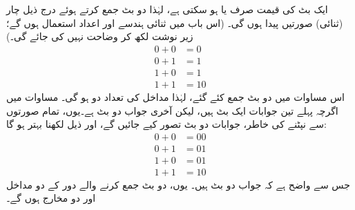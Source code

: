  ایک بٹ کی قیمت صرف   یا   ہو سکتی ہے،  لہٰذا دو بٹ جمع کرتے ہوئے  درج   ذیل چار (ثنائی)    صورتیں پیدا ہوں گی۔ (اس باب میں ثنائی ہندسے اور اعداد استعمال ہوں گے؛  زیر نوشت   لکھ کر وضاحت نہیں کی جائے گی۔)
\begin{align*}
0+0&=0\\
0+1&=1\\
1+0&=1\\
1+1&=10
\end{align*}
اس مساوات میں دو بٹ جمع کئے گئے، لہٰذا  مداخل کی تعداد دو    ہو گی۔ مساوات میں اگرچہ پہلے تین جوابات ایک بٹ   ہیں،  لیکن آخری جواب دو بٹ  ہے۔یوں،  تمام صورتوں سے نپٹنے کی خاطر، جوابات  دو بٹ   تصور کیے جائیں گے، اور   ذیل  لکھنا بہتر ہو گا:
\begin{align*}
0+0&=00\\
0+1&=01\\
1+0&=01\\
1+1&=10
\end{align*}
جس  سے واضح ہے کہ جواب دو بٹ  ہیں۔ یوں،   دو بٹ  جمع کرنے والے دور کے   دو مداخل اور دو مخارج ہوں گے۔

